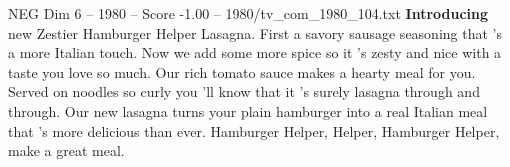 \begin{textsample}{NEG Dim 6 – 1980 – Score -1.00 – 1980/tv\_com\_1980\_104.txt}  \label{ex:f6_neg_034}
\textbf{Introducing} new Zestier Hamburger Helper Lasagna.
First a savory sausage seasoning that 's a more Italian touch.
Now we add some more spice so it 's zesty and nice with a taste you love so much.
Our rich tomato sauce makes a hearty meal for you.
Served on noodles so curly you 'll know that it 's surely lasagna through and through.
Our new lasagna turns your plain hamburger into a real Italian meal that 's more delicious than ever.
Hamburger Helper, Helper, Hamburger Helper, make a great meal.

\end{textsample}
